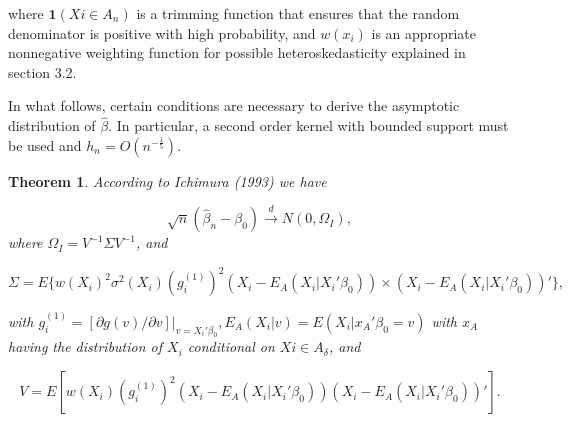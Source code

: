\documentclass[a4paper]{article}
\begin{document}
where $\mathbf{1}{(Xi \in A_n)}$ is a trimming function that ensures that the random denominator is positive with high probability, and $w(x_i)$ is an appropriate nonnegative weighting function for possible heteroskedasticity explained in section 3.2. 

In what follows, certain conditions are necessary to derive the asymptotic distribution of $\hat{\beta}$. In particular, a second order kernel with bounded support must be used and $ h_n = O(n^{-\frac{1}{5}})$.

\newtheorem{theorem}{Theorem}[section]

\begin{theorem}
According to Ichimura (1993) we have

	


\[ \sqrt{n}(\hat{\beta}_n - \beta_0) \stackrel{d}{\rightarrow} N(0,\Omega_I), \] where $\Omega_I = V^{-1}\Sigma V^{-1}$, and

\[\Sigma = E\{w(X_i)^2\sigma^2(X_i)(g_i^{(1)})^2(X_i - E_A(X_i|X_i'\beta_0)) \times (X_i - E_A(X_i|X_i'\beta_0))'\},\]

with $g_i^{(1)} = [\partial g(v)/\partial v]|_{v = X_i'\beta_0}, E_A(X_i|v) = E(X_i|x_A'\beta_0 = v)$ with $x_A$ having the distribution of $X_i$ conditional on $Xi \in A_\delta$, and

\[ V = E[w(X_i)(g_i^{(1)})^2(X_i - E_A(X_i|X_i'\beta_0))(X_i - E_A(X_i|X_i'\beta_0))'].\]

\end{theorem}
\end{document}
